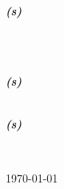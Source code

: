 \begin{titlepage}
    \begin{minipage}{0.5\textwidth}
        \begin{flushleft}
            \large
            \emph{\textbf{(s)}}\\
            \student\\
        \end{flushleft}
    \end{minipage}
    ~
    \begin{minipage}{0.4\textwidth}
        \begin{flushright}
            \large
            \emph{\textbf{(s)}} \\
            \teacher \\

            \vspace{0.5cm}

            \emph{\textbf{(s)}}\\
            \tutor
        \end{flushright}
    \end{minipage}\\[1cm]

    \vfill

    {
        \large \today\par
    }

\end{titlepage}

\restoregeometry
